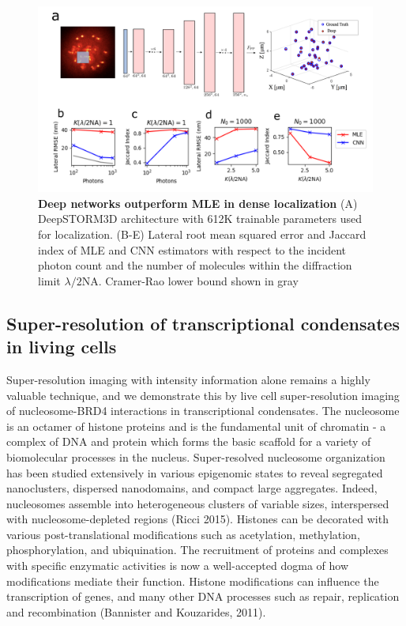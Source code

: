 \documentclass{ucetd}
\begin{document}
\begin{figure}
\includegraphics[width=15cm]{PSF2D.png}
\caption{\textbf{Deep networks outperform MLE in dense localization} (A) DeepSTORM3D architecture with 612K trainable parameters used for localization. (B-E) Lateral root mean squared error and Jaccard index of MLE and CNN estimators with respect to the incident photon count and the number of molecules within the diffraction limit $\lambda/2\mathrm{NA}$. Cramer-Rao lower bound shown in gray}
\end{figure}

\subsection{Super-resolution of transcriptional condensates in living cells}

Super-resolution imaging with intensity information alone remains a highly valuable technique, and we demonstrate this by live cell super-resolution imaging of nucleosome-BRD4 interactions in transcriptional condensates. The nucleosome is an octamer of histone proteins and is the fundamental unit of chromatin - a complex of DNA and protein which forms the basic scaffold for a variety of biomolecular processes in the nucleus. Super-resolved nucleosome organization has been studied extensively in various epigenomic states to reveal segregated nanoclusters, dispersed nanodomains, and compact large aggregates. Indeed, nucleosomes assemble into heterogeneous clusters of variable sizes, interspersed with nucleosome-depleted regions (Ricci 2015). Histones can be decorated with various post-translational modifications such as acetylation, methylation, phosphorylation, and ubiquination. The recruitment of proteins and complexes with specific enzymatic activities is now a well-accepted dogma of how modifications mediate their function. Histone modifications can influence the transcription of genes, and many other DNA processes such as repair, replication and recombination (Bannister and Kouzarides, 2011). 
\end{document}
